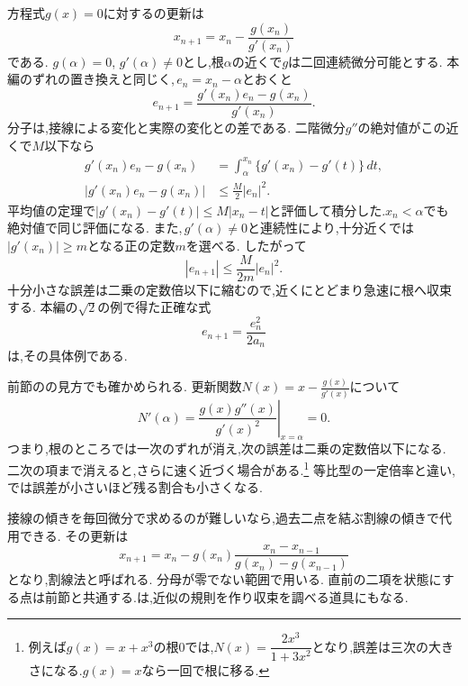 方程式$g(x)=0$に対するの更新は
\[
  x_{n+1}=x_n-\frac{g(x_n)}{g'(x_n)}
\]
である.
$g(\alpha)=0$, $g'(\alpha)\ne0$とし,根$\alpha$の近くで$g$は二回連続微分可能とする.
本編のずれの置き換えと同じく,\,$e_n=x_n-\alpha$とおくと
\[
  e_{n+1}
  =\frac{g'(x_n)e_n-g(x_n)}{g'(x_n)}.
\]
分子は,接線による変化と実際の変化との差である.
二階微分$g''$の絶対値がこの近くで$M$以下なら
\[
  \begin{aligned}
    g'(x_n)e_n-g(x_n)
      &=\int_\alpha^{x_n}\{g'(x_n)-g'(t)\}\,dt,\\
    |g'(x_n)e_n-g(x_n)|
      &\le \frac{M}{2}|e_n|^2.
  \end{aligned}
\]
平均値の定理で$|g'(x_n)-g'(t)|\le M|x_n-t|$と評価して積分した.$x_n<\alpha$でも絶対値で同じ評価になる.
また,\,$g'(\alpha)\ne0$と連続性により,十分近くでは$|g'(x_n)|\ge m$となる正の定数$m$を選べる.
したがって
\[
  |e_{n+1}|\le\frac{M}{2m}|e_n|^2.
\]
十分小さな誤差は二乗の定数倍以下に縮むので,近くにとどまり急速に根へ収束する.
本編の$\sqrt2$の例で得た正確な式
\[
  e_{n+1}=\frac{e_n^2}{2a_n}
\]
は,その具体例である.

前節のの見方でも確かめられる.
更新関数$\displaystyle N(x)=x-\frac{g(x)}{g'(x)}$について
\[
  N'(\alpha)
  =\left.\frac{g(x)g''(x)}{g'(x)^2}\right|_{x=\alpha}=0.
\]
つまり,根のところでは一次のずれが消え,次の誤差は二乗の定数倍以下になる.
二次の項まで消えると,さらに速く近づく場合がある.\footnote{例えば$g(x)=x+x^3$の根$0$では,$N(x)=\dfrac{2x^3}{1+3x^2}$となり,誤差は三次の大きさになる.$g(x)=x$なら一回で根に移る.}
等比型の一定倍率と違い,では誤差が小さいほど残る割合も小さくなる.

接線の傾きを毎回微分で求めるのが難しいなら,過去二点を結ぶ割線の傾きで代用できる.
その更新は
\[
  x_{n+1}
  =x_n-g(x_n)\frac{x_n-x_{n-1}}{g(x_n)-g(x_{n-1})}
\]
となり,割線法と呼ばれる.
分母が零でない範囲で用いる.
直前の二項を状態にする点は前節と共通する.は,近似の規則を作り収束を調べる道具にもなる.

